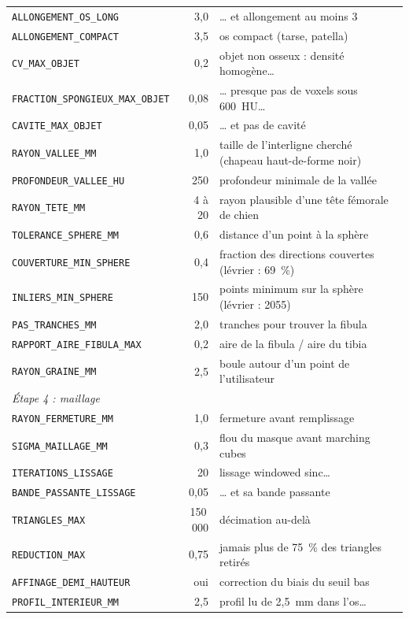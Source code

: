 \documentclass[11pt,a4paper]{article}
\begin{document}
\begin{longtable}{p{5.6cm}rp{7.4cm}}
\texttt{ALLONGEMENT\_OS\_LONG} & 3,0 & \ldots{} et allongement au moins 3 \\
\texttt{ALLONGEMENT\_COMPACT} & 3,5 & os compact (tarse, patella) \\
\texttt{CV\_MAX\_OBJET} & 0,2 & objet non osseux : densité homogène\ldots \\
\texttt{FRACTION\_SPONGIEUX\_MAX\_OBJET} & 0,08 & \ldots{} presque pas de voxels sous 600~HU\ldots \\
\texttt{CAVITE\_MAX\_OBJET} & 0,05 & \ldots{} et pas de cavité \\
\texttt{RAYON\_VALLEE\_MM} & 1,0 & taille de l'interligne cherché (chapeau haut-de-forme noir) \\
\texttt{PROFONDEUR\_VALLEE\_HU} & 250 & profondeur minimale de la vallée \\
\texttt{RAYON\_TETE\_MM} & 4 à 20 & rayon plausible d'une tête fémorale de chien \\
\texttt{TOLERANCE\_SPHERE\_MM} & 0,6 & distance d'un point à la sphère \\
\texttt{COUVERTURE\_MIN\_SPHERE} & 0,4 & fraction des directions couvertes (lévrier : 69~\%) \\
\texttt{INLIERS\_MIN\_SPHERE} & 150 & points minimum sur la sphère (lévrier : 2055) \\
\texttt{PAS\_TRANCHES\_MM} & 2,0 & tranches pour trouver la fibula \\
\texttt{RAPPORT\_AIRE\_FIBULA\_MAX} & 0,2 & aire de la fibula / aire du tibia \\
\texttt{RAYON\_GRAINE\_MM} & 2,5 & boule autour d'un point de l'utilisateur \\
\multicolumn{3}{l}{\textit{Étape 4 : maillage}} \\
\texttt{RAYON\_FERMETURE\_MM} & 1,0 & fermeture avant remplissage \\
\texttt{SIGMA\_MAILLAGE\_MM} & 0,3 & flou du masque avant marching cubes \\
\texttt{ITERATIONS\_LISSAGE} & 20 & lissage windowed sinc\ldots \\
\texttt{BANDE\_PASSANTE\_LISSAGE} & 0,05 & \ldots{} et sa bande passante \\
\texttt{TRIANGLES\_MAX} & 150\,000 & décimation au-delà \\
\texttt{REDUCTION\_MAX} & 0,75 & jamais plus de 75~\% des triangles retirés \\
\texttt{AFFINAGE\_DEMI\_HAUTEUR} & oui & correction du biais du seuil bas \\
\texttt{PROFIL\_INTERIEUR\_MM} & 2,5 & profil lu de 2,5~mm dans l'os\ldots \\

\end{longtable}
\end{document}
